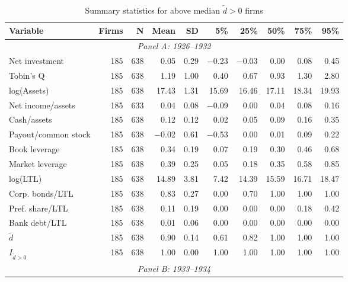 \begin{table}[p]\centering
    \caption{\\ Summary statistics for above median $\tilde{d} > 0$ firms}\scriptsize
    \label{tabapp:summary_I_larged}
    \begin{threeparttable}
        \begin{tabular}{lrrrrrrrrr}
            \toprule
            Variable & Firms & N & Mean & SD & 5\% & 25\% & 50\% & 75\% & 95\% \\
            \midrule
            \multicolumn{10}{c}{\textit{Panel A: 1926--1932}} \\
            \midrule
            Net investment & 185 & 638 & 0.05 & 0.29 & $-$0.23 & $-$0.03 & 0.00 & 0.08 & 0.45 \\
            Tobin's Q & 185 & 638 & 1.19 & 1.00 & 0.40 & 0.67 & 0.93 & 1.30 & 2.80 \\
            log(Assets) & 185 & 638 & 17.43 & 1.31 & 15.69 & 16.46 & 17.11 & 18.34 & 19.93 \\
            Net income/assets & 185 & 633 & 0.04 & 0.08 & $-$0.09 & 0.00 & 0.04 & 0.08 & 0.16 \\
            Cash/assets & 185 & 638 & 0.12 & 0.12 & 0.02 & 0.05 & 0.09 & 0.16 & 0.35 \\
            Payout/common stock & 185 & 638 & $-$0.02 & 0.61 & $-$0.53 & 0.00 & 0.01 & 0.09 & 0.22 \\
            Book leverage & 185 & 638 & 0.34 & 0.19 & 0.07 & 0.19 & 0.30 & 0.46 & 0.68 \\
            Market leverage & 185 & 638 & 0.39 & 0.25 & 0.05 & 0.18 & 0.35 & 0.58 & 0.85 \\
            log(LTL) & 185 & 638 & 14.89 & 3.81 & 7.42 & 14.39 & 15.59 & 16.71 & 18.47 \\
            Corp. bonds/LTL & 185 & 638 & 0.83 & 0.27 & 0.00 & 0.70 & 1.00 & 1.00 & 1.00 \\
            Pref. share/LTL & 185 & 638 & 0.11 & 0.19 & 0.00 & 0.00 & 0.00 & 0.18 & 0.42 \\
            Bank debt/LTL & 185 & 638 & 0.01 & 0.06 & 0.00 & 0.00 & 0.00 & 0.00 & 0.00 \\
            \ensuremath{\tilde{d}} & 185 & 638 & 0.90 & 0.14 & 0.61 & 0.82 & 1.00 & 1.00 & 1.00 \\
            \ensuremath{I_{\tilde{d}>0}} & 185 & 638 & 1.00 & 0.00 & 1.00 & 1.00 & 1.00 & 1.00 & 1.00 \\
            \midrule
            \multicolumn{10}{c}{\textit{Panel B: 1933--1934}} \\

\end{tabular}
\end{threeparttable}
\end{table}
